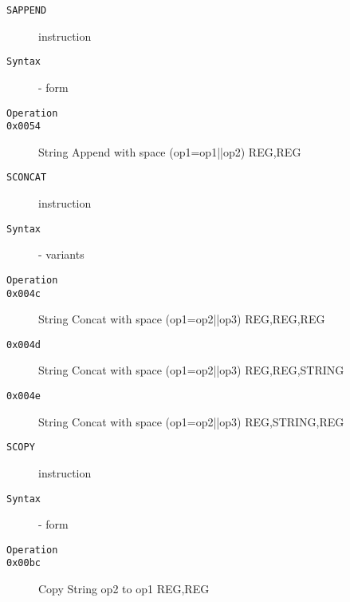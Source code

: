 \clearpage
\begin{description}
\item[\texttt{SAPPEND}] instruction\\
\item[\texttt{Syntax}] - form \\

\item[\texttt{Operation}]
\item[\texttt{}]
\item[\texttt{0x0054}] String Append with space (op1=op1||op2)  {REG,REG}           \\
\end{description}
\clearpage
\begin{description}
\item[\texttt{SCONCAT}] instruction\\
\item[\texttt{Syntax}] - variants\\

\item[\texttt{Operation}]
\item[\texttt{}]
\item[\texttt{0x004c}] String Concat with space (op1=op2||op3)  {REG,REG,REG}       \\
\item[\texttt{0x004d}] String Concat with space (op1=op2||op3)  {REG,REG,STRING}    \\
\item[\texttt{0x004e}] String Concat with space (op1=op2||op3)  {REG,STRING,REG}    \\
\end{description}
\clearpage
\begin{description}
\item[\texttt{SCOPY}] instruction\\
\item[\texttt{Syntax}] - form \\

\item[\texttt{Operation}]
\item[\texttt{}]
\item[\texttt{0x00bc}] Copy String op2 to op1  {REG,REG}           \\
\end{description}
